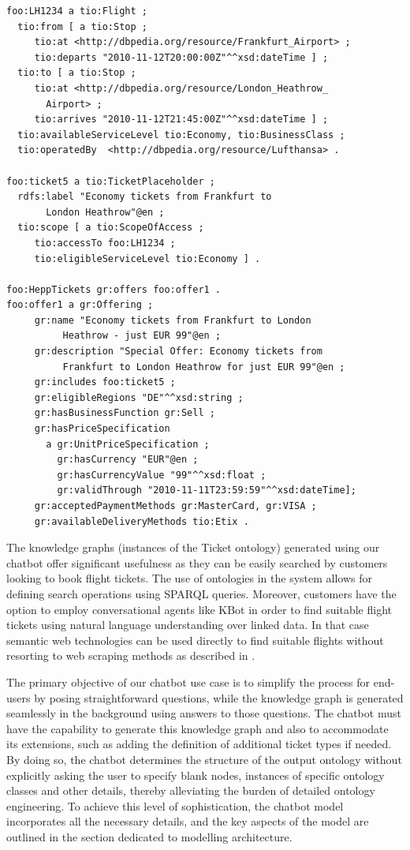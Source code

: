 \documentclass[runningheads]{llncs}
\begin{document}
\begin{lstlisting}[basicstyle=\small]
foo:LH1234 a tio:Flight ;
  tio:from [ a tio:Stop ;
     tio:at <http://dbpedia.org/resource/Frankfurt_Airport> ;
     tio:departs "2010-11-12T20:00:00Z"^^xsd:dateTime ] ;
  tio:to [ a tio:Stop ;
     tio:at <http://dbpedia.org/resource/London_Heathrow_
       Airport> ;
     tio:arrives "2010-11-12T21:45:00Z"^^xsd:dateTime ] ;
  tio:availableServiceLevel tio:Economy, tio:BusinessClass ;          
  tio:operatedBy  <http://dbpedia.org/resource/Lufthansa> .
            
foo:ticket5 a tio:TicketPlaceholder ;
  rdfs:label "Economy tickets from Frankfurt to
       London Heathrow"@en ;
  tio:scope [ a tio:ScopeOfAccess ;
     tio:accessTo foo:LH1234 ;
     tio:eligibleServiceLevel tio:Economy ] .

foo:HeppTickets gr:offers foo:offer1 .
foo:offer1 a gr:Offering ;
     gr:name "Economy tickets from Frankfurt to London
          Heathrow - just EUR 99"@en ;
     gr:description "Special Offer: Economy tickets from
          Frankfurt to London Heathrow for just EUR 99"@en ;
     gr:includes foo:ticket5 ;
     gr:eligibleRegions "DE"^^xsd:string ;
     gr:hasBusinessFunction gr:Sell ;
     gr:hasPriceSpecification
       a gr:UnitPriceSpecification ;
         gr:hasCurrency "EUR"@en ;
         gr:hasCurrencyValue "99"^^xsd:float ;
         gr:validThrough "2010-11-11T23:59:59"^^xsd:dateTime];
     gr:acceptedPaymentMethods gr:MasterCard, gr:VISA ;
     gr:availableDeliveryMethods tio:Etix .	
\end{lstlisting}
The knowledge graphs (instances of the Ticket ontology) generated using our chatbot offer significant usefulness as they can be easily searched by customers looking to book flight tickets. The use of ontologies in the system allows for defining search operations using SPARQL queries.
Moreover, customers have the option to employ conversational agents like KBot\cite{ait2020kbot} in order to find suitable flight tickets using natural language understanding over linked data. In that case semantic web technologies can be used directly to find suitable flights without resorting to web scraping methods as described in \cite{turnip2019application}.        

The primary objective of our chatbot use case is to simplify the process for end-users by posing straightforward questions, while the knowledge graph is generated seamlessly in the background using answers to those questions. The chatbot must have the capability to generate this knowledge graph and also to accommodate its extensions, such as adding the definition of additional ticket types if needed. By doing so, the chatbot determines the structure of the output ontology without explicitly asking the user to specify blank nodes, instances of specific ontology classes and other details, thereby alleviating the burden of detailed ontology engineering. To achieve this level of sophistication, the chatbot model incorporates all the necessary details, and the key aspects of the model are outlined in the section dedicated to modelling architecture.
\end{document}
